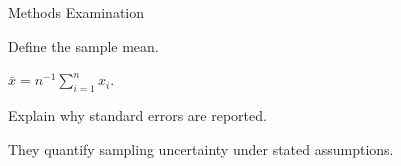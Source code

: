\documentclass{exam}
\begin{document}
\begin{center}\Large Methods Examination\end{center}
\begin{questions}
\question[5] Define the sample mean.
\begin{solution}\(\bar{x}=n^{-1}\sum_{i=1}^{n}x_i\).\end{solution}
\question[5] Explain why standard errors are reported.
\begin{solution}They quantify sampling uncertainty under stated assumptions.\end{solution}
\end{questions}
\end{document}
